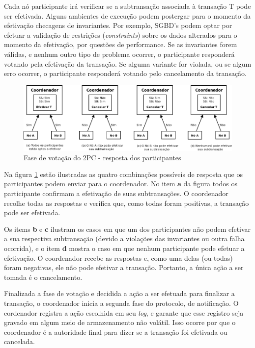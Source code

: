 \documentclass[11pt,twoside,a4paper]{book}
\begin{document}
Cada nó participante irá verificar se a subtransação associada à transação T pode ser efetivada. Alguns ambientes de execução podem postergar para o momento da efetivação checagens de invariantes. Por exemplo, SGBD's podem optar por efetuar a validação de restrições (\emph{constraints}) sobre os dados alterados para o momento da efetivação, por questões de performance. Se as invariantes forem válidas, e nenhum outro tipo de problema ocorrer, o participante responderá votando pela efetivação da transação. Se alguma variante for violada, ou se algum erro ocorrer, o participante responderá votando pelo cancelamento da transação.

\begin{figure}
  \centering
  \includegraphics[width=\textwidth]{fase_votacao_2pc_respostas} 
  \caption{Fase de votação do 2PC - resposta dos participantes}
  \label{fig:fase_votacao_2pc_respostas} 
\end{figure}

Na figura \ref{fig:fase_votacao_2pc_respostas} estão ilustradas as quatro combinações possíveis de resposta que os participantes podem enviar para o coordenador. No item \textbf{a} da figura todos os participante confirmam a efetivação de suas subtransações. O coordenador recolhe todas as respostas e verifica que, como todas foram positivas, a transação pode ser efetivada.

Os items \textbf{b} e \textbf{c} ilustram os casos em que um dos participantes não podem efetivar a sua respectiva subtransação (devido a violações das invariantes ou outra falha ocorrida), e o item \textbf{d} mostra o caso em que nenhum participante pode efetuar a efetivação. O coordenador recebe as respostas e, como uma delas (ou todas) foram negativas, ele não pode efetivar a transação. Portanto, a única ação a ser tomada é o cancelamento.

Finalizada a fase de votação e decidida a ação a ser efetuada para finalizar a transação, o coordenador inicia a segunda fase do protocolo, de notificação. O cordenador registra a ação escolhida em seu \emph{log}, e garante que esse registro seja gravado em algum meio de armazenamento não volátil. Isso ocorre por que o coordenador é a autoridade final para dizer se a transação foi efetivada ou cancelada. 
\end{document}

